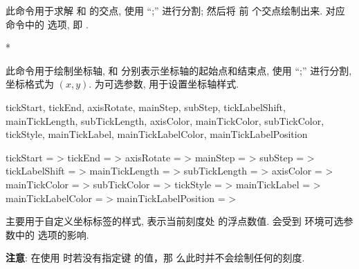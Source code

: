 \documentclass[
  hyper, lang=cn, 
  class=l3dox, 
]{../../zlatex/code/ztex}
\begin{document}
\begin{function}[added=2025-05-15]{\ShowIntersection}
  \begin{syntax}
  \end{syntax}
  此命令用于求解  和  的交点, 使用 ``;'' 进行分割; 然后将
  前  个交点绘制出来.  对应  命令中的  选项,
  即 .
\end{function}
\begin{DocExample}*
\end{DocExample}



\begin{function}[added=2025-05-15]{\ShowAxis}
  \begin{syntax}
  \end{syntax}
  此命令用于绘制坐标轴,  和  分别表示坐标轴的起始点和结束点, 
  使用 ``;'' 进行分割, 坐标格式为 $(x, y)$.  为可选参数, 用于设置坐标轴样式.
\end{function}


\begin{keyval}[parent=ztikz/axis]
  {tickStart, tickEnd, axisRotate, mainStep, subStep, 
  tickLabelShift, mainTickLength, subTickLength,
  axisColor, mainTickColor, subTickColor, tickStyle,
  mainTickLabel, mainTickLabelColor, mainTickLabelPosition}
  \begin{syntax}
    tickStart       = >
    tickEnd         = >
    axisRotate      = >
    mainStep        = >
    subStep         = >
    tickLabelShift  = >\dval{0pt}
    mainTickLength  = >\dval{4pt}
    subTickLength   = >\dval{2pt}
    axisColor       = >
    mainTickColor   = >
    subTickColor    = >
    tickStyle       = >
    mainTickLabel   = >
    mainTickLabelColor    = >
    mainTickLabelPosition = >
  \end{syntax}
   主要用于自定义坐标标签的样式,  表示当前刻度处
  的浮点数值.  会受到  环境可选参数中的  
  选项的影响.\par \textbf{注意}: 在使用  时若没有指定键  的值，那
  么此时并不会绘制任何的刻度.
\end{keyval}
\end{document}
